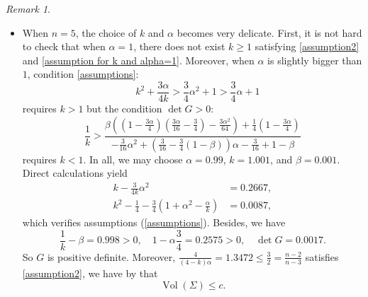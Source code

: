 \documentclass[11pt,letterpaper]{amsart}
\DeclareMathOperator{\Vol}{Vol}
\theoremstyle{definition}
\theoremstyle{remark}
\newtheorem{remark}[theorem]{Remark}
\numberwithin{equation}{section}
\begin{document}
\begin{remark}
\begin{itemize}
\item[(2)] When $n=5$, the choice of $k$ and $\alpha$ becomes very delicate. First, it is not hard to check that when $\alpha=1$, there does not exist $k\geq 1$ satisfying \eqref{assumption2} and \eqref{assumption for k and alpha=1}. Moreover, when $\alpha$ is slightly bigger than $1$, condition \eqref{assumptions}: 
\begin{equation*}
     \quad k^2+\frac{3\alpha}{4k}>\frac{3}{4}\alpha^2+1>\frac{3}{4}\alpha+1
\end{equation*}
requires $k>1$ but the condition $\det G>0$:
\begin{equation*}
    \frac{1}{k}>\frac{\beta\left((1-\frac{3\alpha}{4})(\frac{3\alpha}{16}-\frac{3}{4})-\frac{3\alpha^2}{64}\right)+\frac{1}{4}(1-\frac{3\alpha}{4})}{-\frac{3}{16}\alpha^2+\left(\frac{3}{16}-\frac{3}{4}(1-\beta)\right)\alpha-\frac{3}{16}+1-\beta}
\end{equation*}
requires $k<1$. In all, we may choose $\alpha=0.99$, $k=1.001$, and $\beta=0.001$. Direct calculations yield
\begin{equation*}
\begin{split}
    k-\frac{3}{4k}\alpha^2&=0.2667,\\
    k^2-\frac{1}{4}-\frac{3}{4}\left(1+\alpha^2-\frac{\alpha}{k}\right)&=0.0087,
    \end{split}
\end{equation*}
which verifies assumptions (\ref{assumptions}). Besides, we have
\begin{equation*}
    \frac{1}{k}-\beta=0.998>0, \quad 1-\alpha\frac{3}{4}=0.2575>0, \quad \det G=0.0017.
\end{equation*}
So $G$ is positive definite.  Moreover, $\frac{4}{(4-k)\alpha}=1.3472\leq\frac{3}{2}=\frac{n-2}{n-3}$ satisfies \eqref{assumption2}, we have by \cite[Theorem 1]{antonelli-xu} that
\begin{equation*}
    \Vol(\Sigma)\leqslant c.
\end{equation*}

\end{itemize}
\end{remark}
\end{document}
